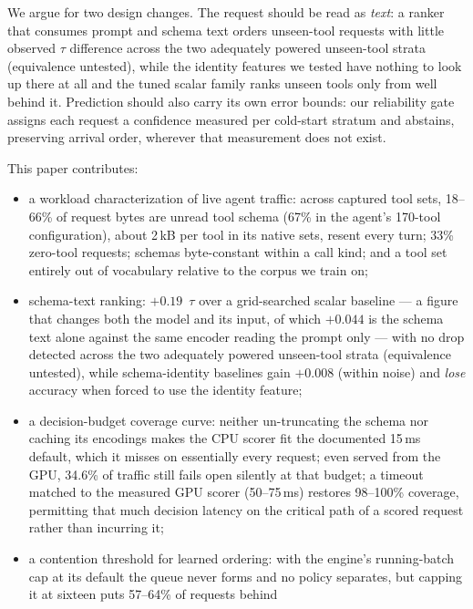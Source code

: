 We argue for two design changes. The request should be read as
\emph{text}: a ranker that consumes prompt and schema text orders unseen-tool
requests with little observed $\tau$ difference across the two adequately
powered unseen-tool strata (equivalence untested), while the identity
features we tested have nothing to look up there at all and the tuned scalar
family ranks unseen tools only from well behind it. Prediction
should also carry its own error bounds: our reliability gate assigns each
request a confidence measured per cold-start stratum and abstains,
preserving arrival order, wherever that measurement does not exist.

This paper contributes:
\begin{itemize}
  \item a workload characterization of live agent traffic: across captured
  tool sets, 18--66\% of
        request bytes are unread tool schema (67\% in the agent's 170-tool
        configuration), about 2\,kB per tool in its native sets,
        resent every turn; 33\% zero-tool requests; schemas byte-constant
        within a call kind;
        and a tool set entirely out of vocabulary relative to the corpus we
        train on;
  \item schema-text ranking: $+0.19$~$\tau$ over a grid-searched scalar
        baseline --- a figure that changes both the model and its input, of
        which $+0.044$ is the schema text alone against the same encoder
        reading the prompt only --- with no drop detected across the two
        adequately powered unseen-tool strata (equivalence untested),
        while schema-identity
        baselines gain $+0.008$ (within noise) and \emph{lose} accuracy when
        forced to use the identity feature;
  \item a decision-budget coverage curve: neither un-truncating the schema
        nor caching its encodings makes the CPU scorer fit the documented
        15\,ms default, which it misses on essentially every request; even
        served from the GPU, 34.6\% of traffic still fails open silently at
        that budget; a timeout matched to the measured GPU scorer
        (50--75\,ms) restores
        98--100\% coverage, permitting that much decision latency on the
        critical path of a scored request rather than incurring it;
  \item a contention threshold for learned ordering: with the engine's
        running-batch cap at its default the queue never forms and no policy
        separates, but capping it at sixteen puts 57--64\% of requests behind

\end{itemize}
